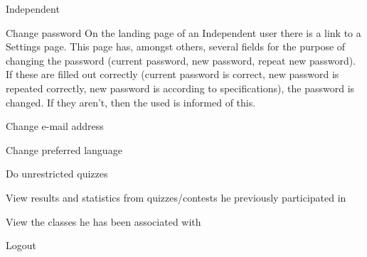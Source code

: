 \begin{section}{Independent}

    \begin{subsection}{Change password}
		\label{indep-pass}
		On the landing page of an Independent user there is a link to a Settings page. This page has, amongst others, several fields for the purpose of changing the password (current password, new password, repeat new password). If these are filled out correctly (current password is correct, new password is repeated correctly, new password is according to specifications), the password is changed. If they aren't, then the used is informed of this.
    \end{subsection}
    \begin{subsection}{Change e-mail address}
    	\label{indep-email}
    \end{subsection}
    \begin{subsection}{Change preferred language}
    	\label{indep-lang}
    \end{subsection}
    \begin{subsection}{Do unrestricted quizzes}
    	\label{indep-unrest}
    \end{subsection}
    \begin{subsection}{View results and statistics from quizzes/contests he previously participated in}
    	\label{indep-resstat}
    \end{subsection}
    \begin{subsection}{View the classes he has been associated with}
    	\label{indep-class}
    \end{subsection}
    \begin{subsection}{Logout}
    	\label{indep-logout}
    \end{subsection}
    
    \end{section}
    

